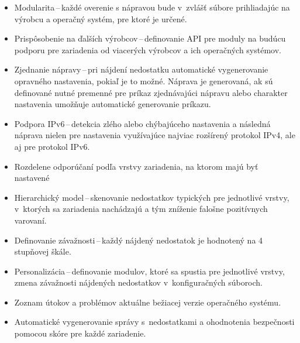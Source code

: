 \begin{itemize}
	\item Modularita\,--\,každé overenie s nápravou bude v~zvlášť súbore prihliadajúc na výrobcu a operačný systém, pre ktoré je určené.
	\vspace{0.5em}
	\item Prispôsobenie na ďalších výrobcov\,--\,definovanie API pre moduly na budúcu podporu pre zariadenia od viacerých výrobcov a ich operačných systémov.
	\vspace{0.5em}
	\item Zjednanie nápravy\,--\,pri nájdení nedostatku automatické vygenerovanie opravného nastavenia, pokiaľ je to možné. Náprava je generovaná, ak sú definované nutné premenné pre príkaz zjednávajúci nápravu alebo charakter nastavenia umožňuje automatické generovanie príkazu.
	\vspace{0.5em}
	\item Podpora IPv6\,--\,detekcia zlého alebo chýbajúceho nastavenia a následná náprava nielen pre nastavenia využívajúce najviac rozšírený protokol IPv4, ale aj pre protokol IPv6.
	\vspace{0.5em}
	\item Rozdelene odporúčaní podľa vrstvy zariadenia, na ktorom majú byť nastavené\vspace{0.5em}
	\item Hierarchický model\,--\,skenovanie nedostatkov typických pre jednotlivé vrstvy, v~ktorých sa zariadenia nachádzajú a tým zníženie falošne pozitívnych varovaní.
	\vspace{0.5em}
	\item Definovanie závažnosti\,--\,každý nájdený nedostatok je hodnotený na 4 stupňovej škále.
	\vspace{0.5em}
	\item Personalizácia\,--\,definovanie modulov, ktoré sa spustia pre jednotlivé vrstvy, zmena závažnosti nájdených nedostatkov v~konfiguračných súboroch.
	\vspace{0.5em}
	\item Zoznam útokov a problémov aktuálne bežiacej verzie operačného systému.
	\vspace{0.5em}
	\item Automatické vygenerovanie správy s~nedostatkami a ohodnotenia bezpečnosti pomocou skóre pre každé zariadenie.

\end{itemize}

\newpage
